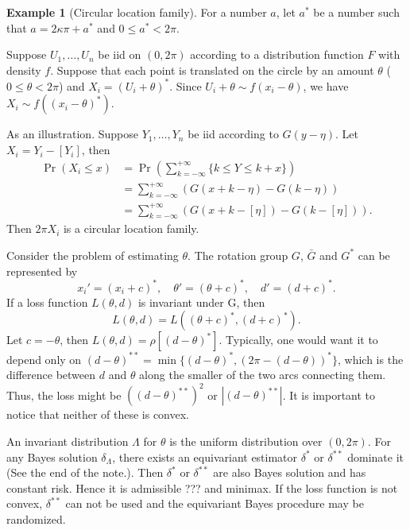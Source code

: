 \documentclass{article}
\theoremstyle{plain}
\theoremstyle{definition}
\newtheorem{example}{Example}
\begin{document}
\begin{example}[Circular location family]
For a number $a$, let $a^*$ be a number such that $a=2\kappa \pi +a^*$ and $0\leq a^* < 2\pi$.

    Suppose $U_1,\ldots,U_n$ be iid on $(0,2\pi)$ according to a distribution function $F$ with density $f$.
    Suppose that each point is translated on the circle by an amount $\theta$ ($0\leq \theta < 2\pi$) and $X_i=(U_i+\theta)^*$.
    Since $U_i+\theta\sim f(x_i-\theta)$, we have $X_i\sim f((x_i-\theta)^*)$.

    As an illustration. Suppose $Y_1,\ldots,Y_n$ be iid according to $G(y-\eta)$.
    Let $X_i=Y_i-[Y_i]$, then
    \begin{equation*}
        \begin{aligned}
            \Pr(X_i\leq x)&=\Pr(\sum_{k=-\infty}^{+\infty} \{k\leq Y\leq k+x\})\\
            &=\sum_{k=-\infty}^{+\infty} (G(x+k-\eta)-G(k-\eta))\\
            &=\sum_{k=-\infty}^{+\infty} (G(x+k-[\eta])-G(k-[\eta])).
        \end{aligned}
    \end{equation*}
Then $2\pi X_i$ is a circular location family.

    Consider the problem of estimating $\theta$.
    The rotation group $G$, $\bar{G}$ and $G^*$ can be represented by
    \begin{equation*}
        x_i'=(x_i+c)^*,\quad
        \theta'=(\theta+c)^*,\quad
        d'=(d+c)^*.
    \end{equation*}
    If a loss function $L(\theta,d)$ is invariant under G, then
    \begin{equation*}
        L(\theta,d)=L((\theta+c)^*,(d+c)^*).
    \end{equation*}
    Let $c=-\theta$, then $L(\theta,d)=\rho[(d-\theta)^*]$.
    Typically, one would want it to depend only on $(d-\theta)^{**}=\min\{(d-\theta)^*,(2\pi-(d-\theta))^*\}$, which is the difference between $d$ and $\theta$ along the smaller of the two arcs connecting them. 
    Thus, the loss might be $((d-\theta)^{**})^2$ or $|(d-\theta)^{**}|$. It is important to notice that neither of these is convex.
    
    An invariant distribution $\Lambda$ for $\theta$ is the uniform distribution over $(0,2\pi)$.
    For any Bayes solution $\delta_{\Lambda}$, there exists an equivariant estimator $\delta^*$ or $\delta^{**}$ dominate it (See the end of the note.).
    Then $\delta^*$ or $\delta^{**}$ are also Bayes solution and has constant risk. Hence it is admissible ??? and minimax.
    If the loss function is not convex, $\delta^{**}$ can not be used and the equivariant Bayes procedure may be randomized.
\end{example}
\end{document}
